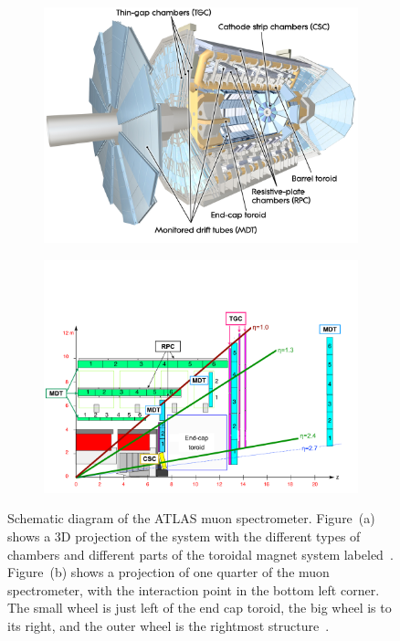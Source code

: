 \begin{figure}
\centering
\begin{subfigure}{.5\textwidth}
  \centering
  \includegraphics[width=\linewidth]{figures/atlas_muon_spectrometer.jpg}
  \caption{}
  \label{fig:atlas_muon_spectrometer_3D}
\end{subfigure}%
\begin{subfigure}{.5\textwidth}
  \centering
  \includegraphics[width=\linewidth]{figures/atlas_old_muon_spec_quarter_cut_recolour.png}
  \caption{}
  \label{fig:atlas_muon_spectrometer_cut}
\end{subfigure}
\caption{Schematic diagram of the ATLAS muon spectrometer. Figure~(a) shows a 3D projection of the system with the different types of chambers and different parts of the toroidal magnet system labeled~\cite{collaboration_atlas_2008}. Figure~(b) shows a projection of one quarter of the muon spectrometer, with the interaction point in the bottom left corner. The small wheel is just left of the end cap toroid, the big wheel is to its right, and the outer wheel is the rightmost structure~\cite{atlas_performance_muon_trigger_2015}.}
\label{fig:atlas_muon_spectrometer}
\end{figure}


